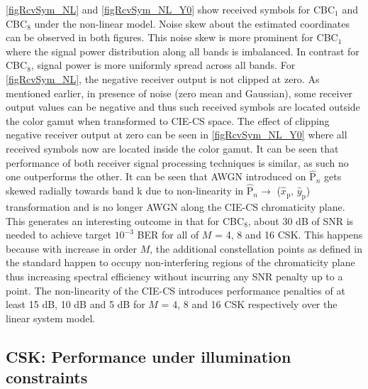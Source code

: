 \figurename{ }\ref{figRcvSym_NL} and \figurename{ }\ref{figRcvSym_NL_Y0} show received symbols for CBC$_{1}$ and CBC$_{8}$ under the non-linear model. Noise skew about the estimated coordinates can be observed in both figures. This noise skew is more prominent for CBC$_{1}$ where the signal power distribution along all bands is imbalanced. In contrast for CBC$_{8}$, signal power is more uniformly spread across all bands. For \figurename{ }\ref{figRcvSym_NL}, the negative receiver output is not clipped at zero. As mentioned earlier, in presence of noise (zero mean and Gaussian), some receiver output values can be negative and thus such received symbols are located outside the color gamut when transformed to CIE-CS space. The effect of clipping negative receiver output at zero can be seen in \figurename{ }\ref{figRcvSym_NL_Y0} where all received symbols now are located inside the color gamut. It can be seen that performance of both receiver signal processing techniques is similar, as such no one outperforms the other. It can be seen that AWGN introduced on $\hat{\text{P}}_{n}$ gets skewed radially towards band k due to non-linearity in $\hat{\text{P}}_{n}\rightarrow$ ($\hat{x}_{\text{p}}$, $\hat{y}_{\text{p}}$) transformation and is no longer AWGN along the CIE-CS chromaticity plane. This generates an interesting outcome in that for CBC$_{8}$, about 30 dB of SNR is needed to achieve target $10^{-3}$ BER for all of $M$ = 4, 8 and 16 CSK. This happens because with increase in order $M$, the additional constellation points as defined in the standard happen to occupy non-interfering regions of the chromaticity plane thus increasing spectral efficiency without incurring any SNR penalty up to a point. The non-linearity of the CIE-CS introduces performance penalties of at least 15 dB, 10 dB and 5 dB for $M$ = 4, 8 and 16 CSK respectively over the linear system model. 

\subsection{CSK: Performance under illumination constraints}
\label{subsec:cskIllumination}

